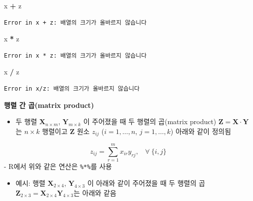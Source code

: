 \documentclass[
  11pt,
]{krantz}
\newenvironment{Shaded}{\begin{snugshade}}{\end{snugshade}}
\newcommand{\NormalTok}[1]{#1}
\newcommand{\OperatorTok}[1]{\textcolor[rgb]{0.43,0.43,0.43}{\textbf{#1}}}
\newcommand{\StringTok}[1]{\textcolor[rgb]{0.5,0.5,0.5}{#1}}
\providecommand{\tightlist}{%
  \setlength{\itemsep}{0pt}\setlength{\parskip}{0pt}}
\begin{document}
\begin{Shaded}
\begin{Highlighting}[]
\NormalTok{x }\OperatorTok{+}\StringTok{ }\NormalTok{z}
\end{Highlighting}
\end{Shaded}

\begin{verbatim}
Error in x + z: 배열의 크기가 올바르지 않습니다
\end{verbatim}

\begin{Shaded}
\begin{Highlighting}[]
\NormalTok{x }\OperatorTok{*}\StringTok{ }\NormalTok{z}
\end{Highlighting}
\end{Shaded}

\begin{verbatim}
Error in x * z: 배열의 크기가 올바르지 않습니다
\end{verbatim}

\begin{Shaded}
\begin{Highlighting}[]
\NormalTok{x }\OperatorTok{/}\StringTok{ }\NormalTok{z}
\end{Highlighting}
\end{Shaded}

\begin{verbatim}
Error in x/z: 배열의 크기가 올바르지 않습니다
\end{verbatim}

\normalsize

\textbf{행렬 간 곱(matrix product)}

\begin{itemize}
\tightlist
\item
  두 행렬 \(\mathrm{\mathbf X}_{n\times m}\), \(\mathrm{\mathbf Y}_{m\times k}\) 이 주어졌을 때 두 행렬의 곱(matrix product) \(\mathrm{\mathbf Z} = \mathrm{\mathbf {X\cdot Y}}\)는 \(n \times k\) 행렬이고 \(\mathrm{\mathbf Z}\) 원소 \(z_{ij}\) (\(i={1,\ldots,n}\), \(j={1,\ldots,k}\)) 아래와 같이 정의됨
\end{itemize}

\[
 z_{ij} = \sum_{r=1}^{m}x_{ir}y_{rj},~~~~\forall~\{i, j\}
\]
- R에서 위와 같은 연산은 \texttt{\%*\%}를 사용

\begin{itemize}
\tightlist
\item
  예시: 행렬 \(\mathrm{\mathbf X}_{2\times 4}\), \(\mathrm{\mathbf Y}_{4\times 3}\) 이 아래와 같이 주어졌을 때 두 행렬의 곱 \(\mathrm{\mathbf Z}_{2\times 3} = \mathrm{\mathbf{X}}_{2\times 4}\mathrm{\mathbf{Y}}_{4 \times 3}\)는 아래와 같음
\end{itemize}
\end{document}
